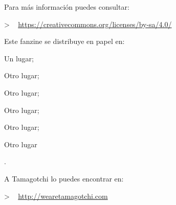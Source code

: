 {	\vspace{1.0\baselineskip}
	
	Para más información puedes consultar:\par
	
	\vspace{0.5\baselineskip}
	
	{\setlength\parindent{1cm}
	> ~ \url{https://creativecommons.org/licenses/by-sa/4.0/}
	}
	
	\vspace{1.0\baselineskip}
	
	Este fanzine se distribuye en papel en:
	\begin{linelist}
	\item Un lugar;
	\item Otro lugar;
	\item Otro lugar;
	\item Otro lugar;
	\item Otro lugar;
	\item Otro lugar
	\end{linelist}.
	
	\vspace{1.0\baselineskip}
	
	A Tamagotchi lo puedes encontrar en:\par
	
	\vspace{0.5\baselineskip}
	
	{\setlength\parindent{1cm}
	> ~ \url{http://wearetamagotchi.com}
	}

}
\rmfamily
\clearpage